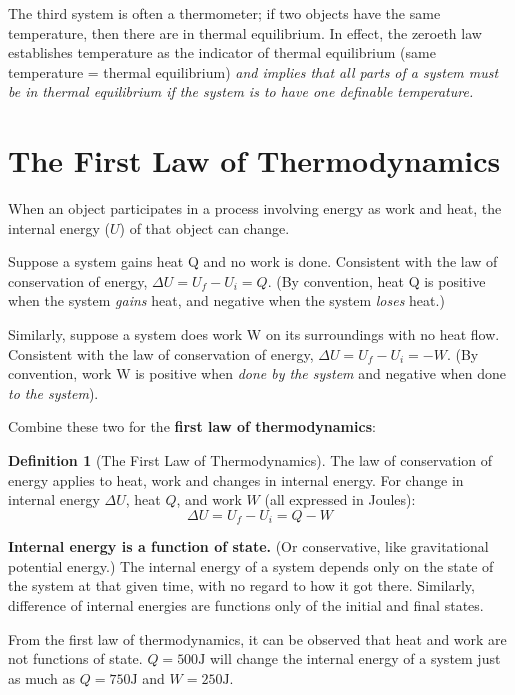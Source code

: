 \documentclass[12pt, a4paper]{article}
\theoremstyle{definition}
\newtheorem{definition}{Definition}
\begin{document}
The third system is often a thermometer; if two objects have the same temperature, then there are in thermal equilibrium.
In effect, the zeroeth law establishes temperature as the indicator of thermal equilibrium (same temperature = thermal equilibrium)
\textit{and implies that all parts of a system must be in thermal equilibrium if the system is to have one definable temperature.}


\section{The First Law of Thermodynamics}

When an object participates in a process involving energy as work and heat, the internal energy ($U$) of that object can change.

Suppose a system gains heat Q and no work is done.
Consistent with the law of conservation of energy, $\Delta U = U_f - U_i = Q$.
(By convention, heat Q is positive when the system \textit{gains} heat, and negative when the system \textit{loses} heat.)

Similarly, suppose a system does work W on its surroundings with no heat flow.
Consistent with the law of conservation of energy, $\Delta U = U_f - U_i = -W$.
(By convention, work W is positive when \textit{done by the system} and negative when done \textit{to the system}).

Combine these two for the \textbf{first law of thermodynamics}:

\begin{definition}[The First Law of Thermodynamics]
    The law of conservation of energy applies to heat, work and changes in internal energy.
    For change in internal energy $\Delta U$, heat $Q$, and work $W$ (all expressed in Joules):
    \[\Delta U = U_f - U_i = Q - W\]
\end{definition}

\textbf{Internal energy is a function of state.} (Or conservative, like gravitational potential energy.) 
The internal energy of a system depends only on the state of the system at that given time, with no regard to how it got there.
Similarly, difference of internal energies are functions only of the initial and final states.

From the first law of thermodynamics, it can be observed that heat and work are not functions of state.
$Q = 500\textrm{J}$ will change the internal energy of a system just as much as $Q = 750\textrm{J}$ and $W = 250\textrm{J}$.
\end{document}
